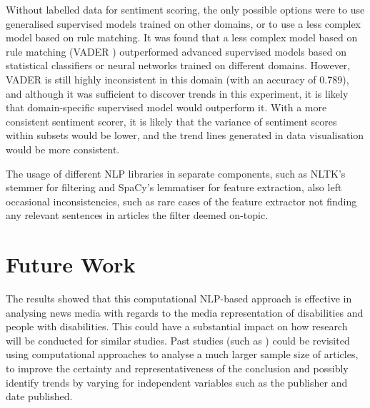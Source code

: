 \documentclass{report}
\begin{document}
Without labelled data for sentiment scoring, the only possible options were to use generalised supervised models trained on other domains, or to use a less complex model based on rule matching.
It was found that a less complex model based on rule matching (VADER \cite{VADER}) outperformed advanced supervised models based on statistical classifiers or neural networks trained on different domains.
However, VADER is still highly inconsistent in this domain (with an accuracy of 0.789), and although it was sufficient to discover trends in this experiment, it is likely that domain-specific supervised model would outperform it.
With a more consistent sentiment scorer, it is likely that the variance of sentiment scores within subsets would be lower, and the trend lines generated in data visualisation would be more consistent.

The usage of different NLP libraries in separate components, such as NLTK's stemmer for filtering and SpaCy's lemmatiser for feature extraction, also left occasional inconsistencies, such as rare cases of the feature extractor not finding any relevant sentences in articles the filter deemed on-topic.

\section{Future Work} \label{Future Work}

The results showed that this computational NLP-based approach is effective in analysing news media with regards to the media representation of disabilities and people with disabilities.
This could have a substantial impact on how research will be conducted for similar studies.
Past studies (such as \cite{gold1999media, coverdale2002depictions, jones2009representations, devotta2013representations}) could be revisited using computational approaches to analyse a much larger sample size of articles, to improve the certainty and representativeness of the conclusion and possibly identify trends by varying for independent variables such as the publisher and date published.
\end{document}
